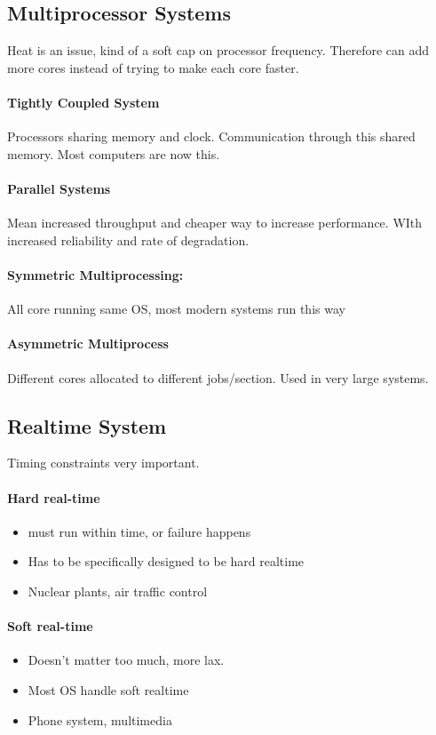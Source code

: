 \documentclass{article}
\newcommand\tab[1][0.5cm]{\hspace*{#1}}
\begin{document}
	\subsection{Multiprocessor Systems}
		Heat is an issue, kind of a soft cap on processor frequency.
		Therefore can add more cores instead of trying to make each core faster.

		\paragraph{Tightly Coupled System} Processors sharing memory and clock. Communication through this shared memory. Most computers are now this.

		\paragraph{Parallel Systems} Mean increased throughput and cheaper way to increase performance. WIth increased reliability and rate of degradation.

		\paragraph{Symmetric Multiprocessing: }All core running same OS, most modern systems run this way
		
		\paragraph{Asymmetric Multiprocess}	Different cores allocated to different jobs/section. Used in very large systems.


	\subsection{Realtime System}
		Timing constraints very important.
		\paragraph{\tab Hard real-time}
		\begin{itemize}
			\item must run within time, or failure happens
			\item Has to be specifically designed to be hard realtime
			\item Nuclear plants, air traffic control
		\end{itemize}

		\paragraph{\tab Soft real-time}
		\begin{itemize}
			\item Doesn't matter too much, more lax.
			\item Most OS handle soft realtime
			\item Phone system, multimedia
		\end{itemize}
\end{document}
